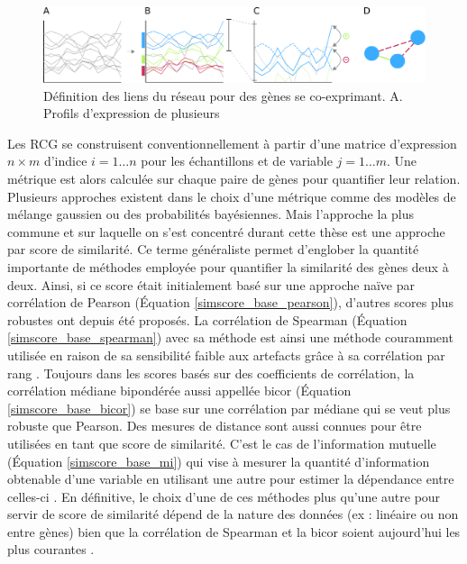 
\begin{figure}
    \centering
    \includegraphics[width=\textwidth]{img/intro/3_coexpr/intro_3_coexpr_expr_group_sign.pdf}
    \caption[Définition des liens du réseau pour des gènes se co-exprimant.]{Définition des liens du réseau pour des gènes se co-exprimant. A. Profils d'expression de plusieurs }
    \label{fig:coexpr_corr_weight_sign}
\end{figure}


Les RCG se construisent conventionnellement à partir d'une matrice d'expression $n \times m$ d'indice $i = 1 … n$ pour les échantillons et de variable $j = 1 … m$. Une métrique est alors calculée sur chaque paire de gènes pour quantifier leur relation. Plusieurs approches existent dans le choix d'une métrique comme des modèles de mélange gaussien ou des probabilités bayésiennes. Mais l'approche la plus commune et sur laquelle on s'est concentré durant cette thèse est une approche par score de similarité. Ce terme généraliste permet d'englober la quantité importante de méthodes employée pour quantifier la similarité des gènes deux à deux. Ainsi, si ce score était initialement basé sur une approche naïve par corrélation de Pearson \cite{Carter2004} (Équation \ref{simscore_base_pearson}), d'autres scores plus robustes ont depuis été proposés. La corrélation de Spearman (Équation \ref{simscore_base_spearman}) avec sa méthode est ainsi une méthode couramment utilisée en raison de sa sensibilité faible aux artefacts grâce à sa corrélation par rang \cite{Chowdhury2019,Serin2016,Kuehne2017}. Toujours dans les scores basés sur des coefficients de corrélation, la corrélation médiane bipondérée aussi appellée bicor \cite{Song2012} (Équation \ref{simscore_base_bicor}) se base sur une corrélation par médiane qui se veut plus robuste que Pearson. Des mesures de distance sont aussi connues pour être utilisées en tant que score de similarité. C'est le cas de l'information mutuelle (Équation \ref{simscore_base_mi}) qui vise à mesurer la quantité d'information obtenable d'une variable en utilisant une autre pour estimer la dépendance entre celles-ci \cite{Kullback1997}. En définitive, le choix d'une de ces méthodes plus qu'une autre pour servir de score de similarité dépend de la nature des données (ex : linéaire ou non entre gènes) bien que la corrélation de Spearman et la bicor soient aujourd'hui les plus courantes \cite{Serin2016}.

